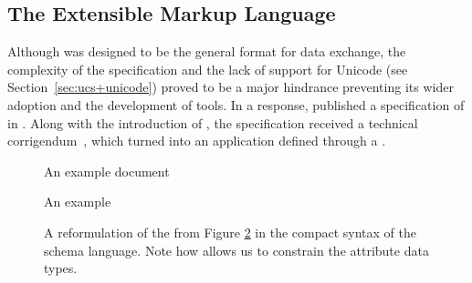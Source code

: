 \subsection{The Extensible Markup Language}
Although  was designed to be the general format for data exchange,
the complexity of the specification and the lack of support for Unicode (see
Section~\ref{sec:ucs+unicode}) proved to be a major hindrance preventing its
wider adoption and the development of  tools. In a response,
 published a specification of  in \citeyear{bray98}.
Along with the introduction of , the  specification
received a technical corrigendum~\cite{goldfarb97:webSGML}, which turned
 into an  application defined through a
.

\begin{figure}
  \caption{An example  document}
  \label{fig:recipe}\bigskip
\end{figure}

\begin{figure}
  \caption{An example }
  \label{fig:recipe-dtd}
\end{figure}
        
\begin{figure}
  \caption{A reformulation of the  from Figure \ref{fig:recipe-dtd}
    in the compact syntax of the  schema
    language. Note how  allows us to
    constrain the attribute data types.}
  \label{fig:recipe-rnc}
\end{figure}

